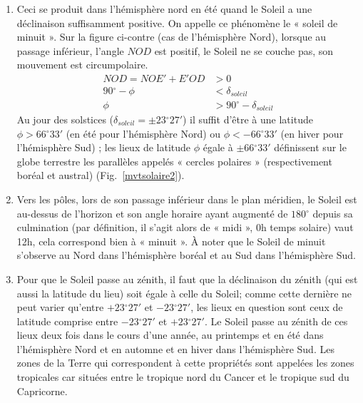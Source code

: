\documentclass[a4paper,10pt]{report}
\renewcommand{\deg}{\ensuremath{^{\circ}}}
\begin{document}
\begin{Answer}
\begin{enumerate}
  \item Ceci se produit dans l'hémisphère nord en été quand le Soleil
    a une déclinaison suffisamment positive. On appelle ce phénomène
    le « soleil de minuit ». Sur la figure ci-contre (cas de
    l'hémisphère Nord), lorsque au passage inférieur, l'angle $NOD$
    est positif, le Soleil ne se couche pas, son mouvement est
    circumpolaire.
    \begin{align*}
      NOD = NOE' + E'OD &> 0 \\
      90\deg - \phi &< \delta_{soleil} \\
      \phi &> 90\deg - \delta_{soleil}
    \end{align*}
    Au jour des solstices ($\delta_{soleil} = \pm 23\deg27'$) il
    suffit d'être à une latitude $\phi > 66\deg33'$ (en été pour
    l'hémisphère Nord) ou $\phi < - 66\deg33'$ (en hiver pour
    l'hémisphère Sud) ; les lieux de latitude $\phi$ égale à $\pm
    66\deg33'$ définissent sur le globe terrestre les parallèles
    appelés « cercles polaires » (respectivement boréal et austral)
    (Fig.~\ref{mvtsolaire2}).

  \item Vers les pôles, lors de son passage inférieur dans le plan
    méridien, le Soleil est au-dessus de l'horizon et son angle
    horaire ayant augmenté de $180\deg$ depuis sa culmination (par
    définition, il s'agit alors de « midi », 0h temps solaire) vaut
    12h, cela correspond bien à « minuit ». À noter que le Soleil de
    minuit s'observe au Nord dans l'hémisphère boréal et au Sud dans
    l'hémisphère Sud.

  \item Pour que le Soleil passe au zénith, il faut que la déclinaison
    du zénith (qui est aussi la latitude du lieu) soit égale à celle
    du Soleil; comme cette dernière ne peut varier qu'entre
    $+23\deg27'$ et $-23\deg27'$, les lieux en question sont ceux
    de latitude comprise entre $-23\deg27'$ et $+23\deg27'$. Le
    Soleil passe au zénith de ces lieux deux fois dans le cours d'une
    année, au printemps et en été dans l'hémisphère Nord et en automne
    et en hiver dans l'hémisphère Sud. Les zones de la Terre qui
    correspondent à cette propriétés sont appelées les zones
    tropicales car situées entre le tropique nord du Cancer et le
    tropique sud du Capricorne.


\end{enumerate}
\end{Answer}
\end{document}
